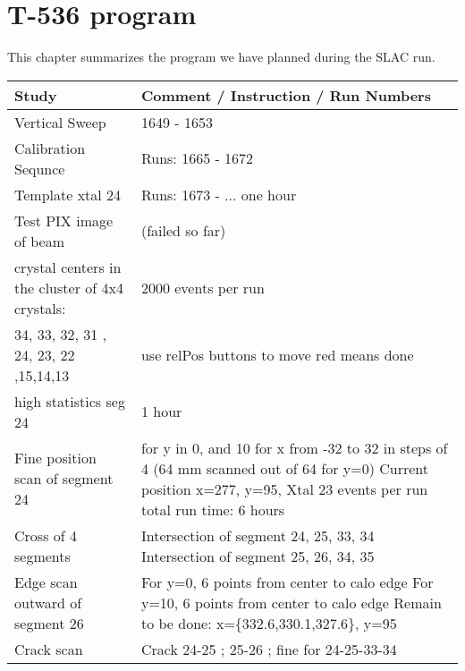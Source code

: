 \chapter{T-536 program}
\label{app:program}

This chapter summarizes the program we have planned during the SLAC run.

\begin{landscape}

\begin{longtable}{|p{8cm}|p{12cm}|} \hline
Study &  Comment / Instruction / Run Numbers \\ \hline
Vertical Sweep & 1649 - 1653 \\ \hline
Calibration Sequnce & Runs: 1665 - 1672 \\ \hline
Template xtal 24 & Runs: 1673 - ... one hour \\ \hline
Test PIX image of beam & (failed so far) \\ \hline
crystal centers in the \newline cluster of 4x4 crystals: & 2000 events per run \\ \hline
34, 33, 32, 31 \newline 25, 24, 23, 22 \newline 16,15,14,13 & use relPos buttons to move \newline red means done \\ \hline
high statistics seg 24 & 1 hour \\ \hline
Fine position scan of segment 24 & for y in 0, and 10 \newline for x from -32 to 32 in steps of 4  \newline (64 mm scanned out of 64 for y=0) \newline Current position x=277, y=95, Xtal 23 \newline 3000 events per run \newline total run time: 6 hours \\ \hline
Cross of 4 segments & Intersection of segment 24, 25, 33, 34  \newline Intersection of segment 25, 26, 34, 35 \\ \hline
Edge scan outward of segment 26 & For y=0, 6 points from center to calo edge \newline For y=10, 6 points from center to calo edge \newline Remain to be done: x=\{332.6,330.1,327.6\}, y=95 \\ \hline
Crack scan & Crack 24-25 ; 25-26 ; fine for 24-25-33-34 \\ \hline

\end{longtable}
\end{landscape}
